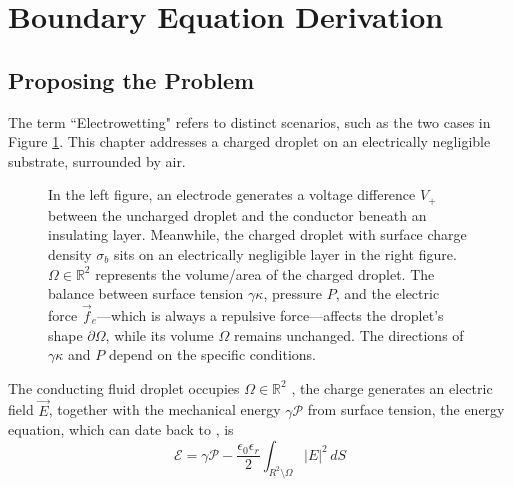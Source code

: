 \section{Boundary Equation Derivation}
\subsection{Proposing the Problem}
The term ``Electrowetting" refers to distinct scenarios, such as the two cases in Figure \ref{fig:ew_2cases}. This chapter addresses a charged droplet on an electrically negligible substrate, surrounded by air.
\begin{figure}[H]
    \centering
{}\hspace{.5em}
    
    \caption{\small In the left figure, an electrode generates a voltage difference $V_+$ between the uncharged droplet and the conductor beneath an insulating layer. Meanwhile, the charged droplet with surface charge density $\sigma_b$ sits on an electrically negligible layer in the right figure. $\Omega\in\mathbb{R}^2$ represents the volume/area of the charged droplet. The balance between surface tension $\gamma\kappa$, pressure $P$, and the electric force $\vec{f}_e$—which is always a repulsive force—affects the droplet's shape $\partial \Omega$, while its volume $\Omega$ remains unchanged. The directions of $\gamma\kappa$ and $P$ depend on the specific conditions.
}
     \label{fig:ew_2cases}
\end{figure}
\noindent The conducting fluid droplet occupies $\Omega\in\mathbb{R}^2$ , the charge generates an electric field $\vec{E}$, together with the mechanical energy $\gamma\mathcal{P}$ from surface tension, the energy equation, which can date back to \citet{Rayleigh_1882}, is
\begin{equation}\label{eqn:minE}
    \mathcal{E} = \gamma \mathcal{P} - \frac{\epsilon_0 \epsilon_r}{2} \int_{R^2 \setminus \Omega} |E|^2 \, dS
\end{equation}

